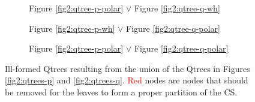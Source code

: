\begin{figure}[H]
	\centering
	\begin{subfigure}[b]{.3\linewidth}
		\centering
		\caption{Figure \ref{fig2:qtree-p-polar} $\vee$ Figure \ref{fig2:qtree-q-wh}}
	\end{subfigure}\hfill
	\begin{subfigure}[b]{.3\linewidth}
		\centering
		\caption{Figure \ref{fig2:qtree-p-wh} $\vee$ Figure \ref{fig2:qtree-q-polar} }
	\end{subfigure}\hfill
	\begin{subfigure}[b]{.3\linewidth}
		\centering
		\caption{Figure \ref{fig2:qtree-p-polar} $\vee$ Figure \ref{fig2:qtree-q-polar}}
	\end{subfigure}
	\caption{Ill-formed Qtrees resulting from the union of the Qtrees in Figures \ref{fig2:qtrees-p} and \ref{fig2:qtrees-q}. \textcolor{red}{Red} nodes are nodes that should be removed for the leaves to form a proper partition of the CS.}
	\label{fig2:qtree-pvq-ill-formed}
\end{figure}








